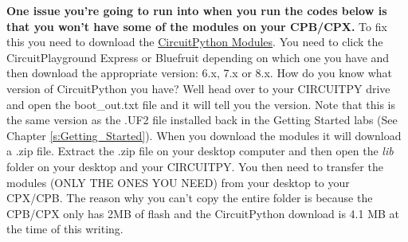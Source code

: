 {\bf One issue you're going to run into when
you run the codes below is that you won't have some of the modules on
your CPB/CPX.} To fix this you need to download
the \href{https://circuitpython.org/downloads}{CircuitPython
Modules}. You need to click the CircuitPlayground Express or Bluefruit
depending on which one you have and then download the appropriate
version: 6.x, 7.x or 8.x. How do you know what version of CircuitPython
you have? Well head over to your CIRCUITPY drive and open the
boot\_out.txt file and it will tell you the version. Note that this is
the same version as the .UF2 file installed back in the Getting
Started labs (See Chapter \ref{s:Getting_Started}). When you download
the modules it will download a .zip file. Extract the .zip file on
your desktop computer and then open the {\it lib} folder on your
desktop and your CIRCUITPY. You then need to transfer the modules
(ONLY THE ONES YOU NEED) from your desktop to your CPX/CPB. The reason
why you can't copy the entire folder is because the CPB/CPX only has
2MB of flash and the CircuitPython download is 4.1 MB at the time of
this writing. 
